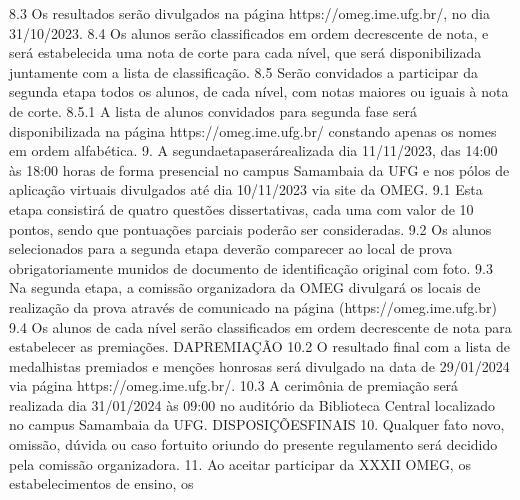                       8.3 Os resultados serão divulgados na página https://omeg.ime.ufg.br/, no dia
                      31/10/2023.
                      8.4 Os alunos serão classificados em ordem decrescente de nota, e será
                      estabelecida uma nota de corte para cada nível, que será disponibilizada
                      juntamente com a lista de classificação.
                      8.5 Serão convidados a participar da segunda etapa todos os alunos, de cada
                      nível, com notas maiores ou iguais à nota de corte.
                      8.5.1 A lista de alunos convidados para segunda fase será disponibilizada na
                      página https://omeg.ime.ufg.br/ constando apenas os nomes em ordem
                      alfabética.
                 9.   A segundaetapaserárealizada dia 11/11/2023, das 14:00 às 18:00 horas de
                      forma presencial no campus Samambaia da UFG e nos pólos de aplicação
                     virtuais divulgados até dia 10/11/2023 via site da OMEG.
                     9.1 Esta etapa consistirá de quatro questões dissertativas, cada uma com
                     valor   de 10 pontos, sendo que pontuações parciais poderão ser
                     consideradas.
                     9.2 Os alunos selecionados para a segunda etapa deverão comparecer ao
                     local de prova obrigatoriamente munidos de documento de identificação
                     original com foto.
                     9.3 Na segunda etapa, a comissão organizadora da OMEG divulgará os
                     locais   de realização da prova através de comunicado na página
                     (https://omeg.ime.ufg.br)
                     9.4 Os alunos de cada nível serão classificados em ordem decrescente de
                     nota para estabelecer as premiações.
                                                 DAPREMIAÇÃO
                     10.2 O resultado final com a lista de medalhistas premiados e menções
                     honrosas     será    divulgado    na   data    de    29/01/2024    via   página
                     https://omeg.ime.ufg.br/.
                     10.3 A cerimônia de premiação será realizada dia 31/01/2024 às 09:00 no
                     auditório da Biblioteca Central localizado no campus Samambaia da UFG.
                                              DISPOSIÇÕESFINAIS
               10.   Qualquer fato novo, omissão, dúvida ou caso fortuito oriundo do presente
                     regulamento será decidido pela comissão organizadora.
               11.   Ao aceitar participar da XXXII OMEG, os estabelecimentos de ensino, os
